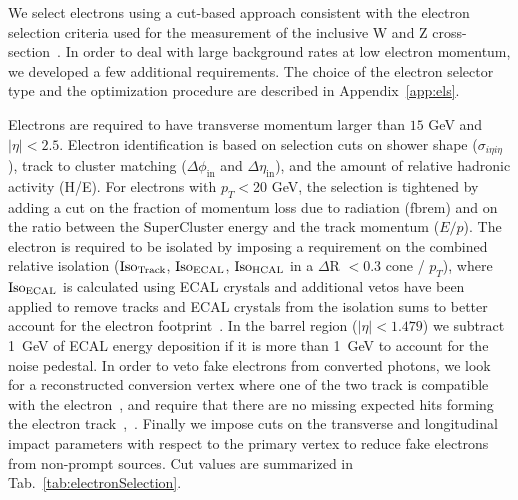 We select electrons using a cut-based approach consistent with the electron 
selection criteria used for the measurement of the inclusive W and Z 
cross-section~\cite{VBTFCrossSectionNote}. In order to deal with large 
background rates at low electron momentum, we developed a few additional 
requirements. The choice of the electron selector type and the optimization procedure
are described in Appendix~\ref{app:els}.

Electrons are required to have transverse momentum larger than $15$ GeV and $|\eta| < 2.5$. 
Electron identification is based on selection cuts on shower shape ($\sigma_{i\eta i\eta}$), 
track to cluster matching ($\Delta \phi_{\mathrm{in}}$ and $\Delta \eta_{\mathrm{in}}$), and the amount 
of relative hadronic activity (H/E). 
For electrons with $p_T<$20 GeV, the selection is tightened by adding a cut on the fraction of momentum 
loss due to radiation (fbrem) and on the ratio between the SuperCluster energy and the track momentum ($E/p$).
The electron is required to be isolated by imposing a requirement on the combined relative isolation 
($\rm{Iso}_{Track}$, $\rm{Iso}_{ECAL}$, $\rm{Iso}_{HCAL}$ in a $\Delta$R $< 0.3$ cone / $p_{T}$), 
where $\rm{Iso}_{ECAL}$ is calculated using ECAL crystals and additional vetos have been 
applied to remove tracks and ECAL crystals from the isolation sums to better account for 
the electron footprint~\cite{ElIso}. In the barrel region ($|\eta| < 1.479$) we subtract 1~GeV of 
ECAL energy deposition if it is more than 1~GeV to account for the noise pedestal. 
In order to veto fake electrons from converted photons, we look for a reconstructed conversion vertex where 
one of the two track is compatible with the electron~\cite{ConversionNote}, 
and require that there are no missing expected hits forming the electron track~\cite{ConversionNote},~\cite{NExpHits}. 
Finally we impose cuts on the transverse and longitudinal impact parameters with
respect to the primary vertex to reduce fake electrons from non-prompt
sources. Cut values are summarized in Tab.~\ref{tab:electronSelection}.

